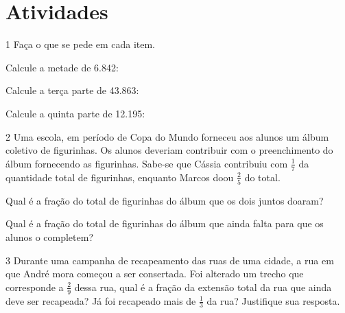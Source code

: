 \section*{Atividades}

\num{1} Faça o que se pede em cada item.

\begin{escolha}
\item
Calcule a metade de 6.842: 

\item
Calcule a terça parte de 43.863: 

\item
Calcule a quinta parte de 12.195: 


\end{escolha}

\num{2} Uma escola, em período de Copa do Mundo forneceu aos alunos um
álbum coletivo de figurinhas. Os alunos deveriam contribuir com o
preenchimento do álbum fornecendo as figurinhas. Sabe-se que Cássia
contribuiu com $\frac{1}{7}$ da quantidade total de figurinhas, enquanto Marcos
doou $\frac{2}{5}$ do total.

\begin{escolha}
\item
  Qual é a fração do total de figurinhas do álbum que os dois juntos doaram?\\
\bigskip

\item
  Qual é a fração do total de figurinhas do álbum que ainda falta para que os alunos o completem?\\
\bigskip
\end{escolha}


\num{3} Durante uma campanha de recapeamento das ruas de uma cidade, a rua em
que André mora começou a ser consertada. Foi alterado um trecho que corresponde a $\frac{2}{9}$ dessa rua, qual é a fração da extensão total da rua que ainda deve ser
recapeada? Já foi recapeado mais de $\frac{1}{3}$ da rua? Justifique sua resposta.


